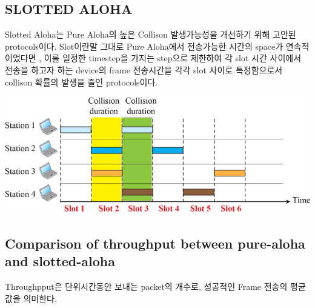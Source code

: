 \begin{multicols}{2}
\subsection{SLOTTED ALOHA}
Slotted Aloha는 Pure Aloha의 높은 Collison 발생가능성을 개선하기 위해 고안된 protocols이다. Slot이란말 그대로 Pure Aloha에서 전송가능한 시간의 space가 연속적이었다면 , 이를 일정한 timestep을 가지는 step으로 제한하여 각 slot 시간 사이에서 전송을 하고자 하는 device의 frame 전송시간을 각각 slot 사이로 특정함으로서 collison 확률의 발생을 줄인 protocols이다.
    \begin{minipage}{\columnwidth}
    \vspace{2mm}
    \centering%
    \includegraphics[width=.9\textwidth]{image/week12/1-2.png}
    \vspace{-4mm}
    \end{minipage}
\vspace{-2mm}
\subsection{Comparison of throughput between pure-aloha and slotted-aloha}
Throughpput은 단위시간동안 보내는 packet의 개수로, 성공적인 Frame 전송의 평균값을 의미한다.
\vspace{-4mm}

\end{multicols}
